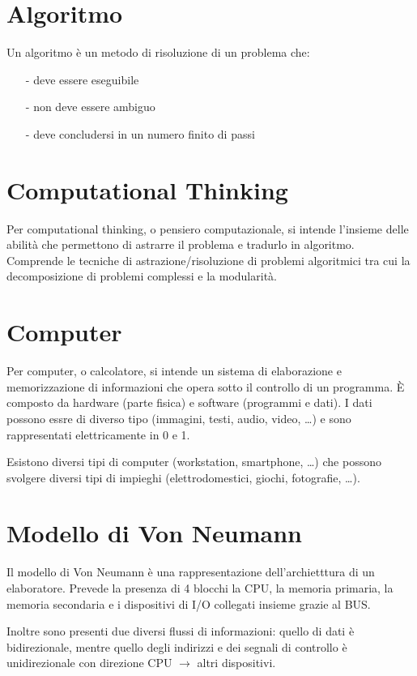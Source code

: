 \documentclass{article}
\begin{document}
\section{Algoritmo}
Un algoritmo è un metodo di risoluzione di un problema che:
\begin{itemize}[topsep=5pt, itemsep=0pt]
	\item[-] deve essere eseguibile
	\item[-] non deve essere ambiguo
	\item[-] deve concludersi in un numero finito di passi
\end{itemize}

\section{Computational Thinking}
Per computational thinking, o pensiero computazionale, si intende l'insieme delle abilità che permettono di astrarre
il problema e tradurlo in algoritmo. Comprende le tecniche di astrazione/risoluzione di problemi algoritmici tra
cui la decomposizione di problemi complessi e la modularità.

\newpage


\section{Computer}
Per computer, o calcolatore, si intende un sistema di elaborazione e memorizzazione di informazioni che opera sotto
il controllo di un programma. È composto da hardware (parte fisica) e software (programmi e dati). I dati possono
essre di diverso tipo (immagini, testi, audio, video, \dots) e sono rappresentati elettricamente in 0 e 1.

Esistono diversi tipi di computer (workstation, smartphone, \dots) che possono svolgere diversi tipi di impieghi
(elettrodomestici, giochi, fotografie, \dots).


\section{Modello di Von Neumann}
Il modello di Von Neumann è una rappresentazione dell'archietttura di un elaboratore. Prevede la presenza di 4 blocchi
la CPU, la memoria primaria, la memoria secondaria e i dispositivi di I/O collegati insieme grazie al BUS.

Inoltre sono presenti due diversi flussi di informazioni: quello di dati è bidirezionale, mentre quello degli indirizzi
e dei segnali di controllo è unidirezionale con direzione CPU \(\rightarrow\) altri dispositivi.
\end{document}

